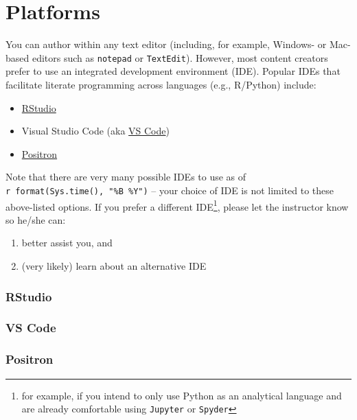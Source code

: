 \documentclass[
  letterpaper,
  DIV=11,
  numbers=noendperiod,
  oneside]{scrreprt}
\providecommand{\tightlist}{%
  \setlength{\itemsep}{0pt}\setlength{\parskip}{0pt}}\usepackage{longtable,booktabs,array}
\begin{document}

\chapter{Platforms}\label{platforms}

You can author within any text editor (including, for example, Windows-
or Mac-based editors such as \texttt{notepad} or \texttt{TextEdit}).
However, most content creators prefer to use an integrated development
environment (IDE). Popular IDEs that facilitate literate programming
across languages (e.g., R/Python) include:

\begin{itemize}
\tightlist
\item
  \href{https://posit.co/download/rstudio-desktop/}{RStudio}
\item
  Visual Studio Code (aka \href{https://code.visualstudio.com/}{VS
  Code})
\item
  \href{https://positron.posit.co/}{Positron}
\end{itemize}

Note that there are very many possible IDEs to use as of
\texttt{r\ format(Sys.time(),\ "\%B\ \%Y")} -- your choice of IDE is not
limited to these above-listed options. If you prefer a different
IDE\footnote{for example, if you intend to only use Python as an
  analytical language and are already comfortable using \texttt{Jupyter}
  or \texttt{Spyder}}, please let the instructor know so he/she can:

\begin{enumerate}
\def\labelenumi{\arabic{enumi}.}
\tightlist
\item
  better assist you, and
\item
  (very likely) learn about an alternative IDE
\end{enumerate}

\subsection{RStudio}\label{rstudio}

\subsection{VS Code}\label{vs-code}

\subsection{Positron}\label{positron}
\end{document}
